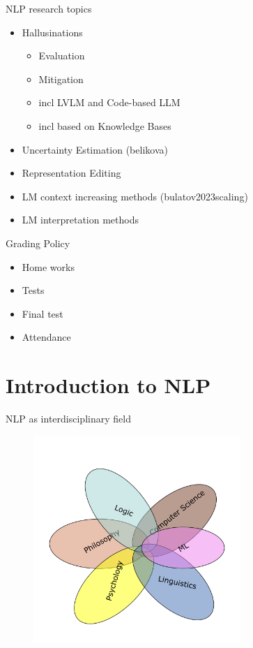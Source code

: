 \documentclass{beamer}
\begin{document}
\begin{frame}{NLP research topics}
\begin{itemize}
        \item Hallusinations
        \begin{itemize}
        \item Evaluation
        \item Mitigation
        \item incl LVLM and Code-based LLM
        \item incl based on Knowledge Bases
        \end{itemize}
        \item Uncertainty Estimation (belikova)
        \item Representation Editing
        \item LM context increasing methods (bulatov2023scaling)
        \item LM interpretation methods
    \end{itemize}
\end{frame}

\begin{frame}{Grading Policy}{}
    \begin{itemize}
        \item Home works
        \item Tests
        \item Final test
        \item Attendance
    \end{itemize}
\end{frame}

\section{Introduction to NLP}

\begin{frame}{NLP as interdisciplinary field}{}
    \begin{figure}
        \centering
        \includegraphics[width=0.7\textwidth,keepaspectratio]{images/interdisciplinary_field}
        \label{fig:interdisciplinary_field}
    \end{figure}
\end{frame}
\end{document}
